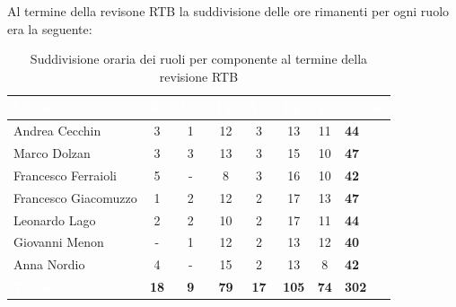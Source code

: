 Al termine della revisone RTB la suddivisione delle ore rimanenti per ogni ruolo era la seguente:
\setlength{\tabcolsep}{10pt}
\renewcommand{\arraystretch}{1.4}
\begin{table}[h!]
    \centering
    \begin{tabularx}{\textwidth}{| l | c | c | c | c | c | c | X |}
        \hline
        \rowcolor{headerrow} \textbf{\textcolor{white}{Membro}} & \textbf{\textcolor{white}{R.}} & \textbf{\textcolor{white}{Am.}} & \textbf{\textcolor{white}{Pj.}} & \textbf{\textcolor{white}{An.}} & \textbf{\textcolor{white}{Pg.}} & \textbf{\textcolor{white}{V.}}&\textbf{\textcolor{white}{Totale}} \\
        \hline
        Andrea Cecchin & 3 & 1 & 12 & 3 & 13 & 11 & \textbf{44}\\
        \hline
        Marco Dolzan & 3 & 3 & 13 & 3 & 15 & 10 & \textbf{47}\\
        \hline
        Francesco Ferraioli & 5 & - & 8& 3 & 16 & 10& \textbf{42}\\
        \hline  
        Francesco Giacomuzzo & 1 & 2 & 12 & 2 & 17 & 13 & \textbf{47}\\
        \hline
        Leonardo Lago & 2 & 2 & 10 & 2 & 17 & 11& \textbf{44}\\
        \hline
        Giovanni Menon & - & 1 & 12 & 2 & 13 & 12& \textbf{40}\\
        \hline
        Anna Nordio & 4 & - & 15 & 2 & 13 & 8& \textbf{42}\\
        \hline
    \cellcolor{headerrow} \textbf{\textcolor{white}{Totale}} & \textbf{18} & \textbf{9} & \textbf{79} & \textbf{17} & \textbf{105} & \textbf{74}& \textbf{302}\\
        \hline
    \end{tabularx} 
    \caption{Suddivisione oraria dei ruoli per componente al termine della revisione RTB}
    \label{tab:ruoliprerisuddivisione}
\end{table}\\

